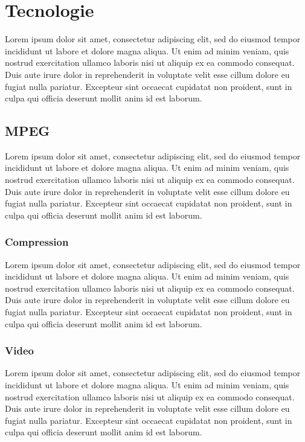 %
%
\chapter{Tecnologie}

Lorem ipsum dolor sit amet, consectetur adipiscing elit, sed do eiusmod tempor incididunt ut labore et dolore magna aliqua. Ut enim ad minim veniam, quis nostrud exercitation ullamco laboris nisi ut aliquip ex ea commodo consequat. Duis aute irure dolor in reprehenderit in voluptate velit esse cillum dolore eu fugiat nulla pariatur. Excepteur sint occaecat cupidatat non proident, sunt in culpa qui officia deserunt mollit anim id est laborum.

\section{MPEG}
Lorem ipsum dolor sit amet, consectetur adipiscing elit, sed do eiusmod tempor incididunt ut labore et dolore magna aliqua. Ut enim ad minim veniam, quis nostrud exercitation ullamco laboris nisi ut aliquip ex ea commodo consequat. Duis aute irure dolor in reprehenderit in voluptate velit esse cillum dolore eu fugiat nulla pariatur. Excepteur sint occaecat cupidatat non proident, sunt in culpa qui officia deserunt mollit anim id est laborum.

\subsection{Compression}
Lorem ipsum dolor sit amet, consectetur adipiscing elit, sed do eiusmod tempor incididunt ut labore et dolore magna aliqua. Ut enim ad minim veniam, quis nostrud exercitation ullamco laboris nisi ut aliquip ex ea commodo consequat. Duis aute irure dolor in reprehenderit in voluptate velit esse cillum dolore eu fugiat nulla pariatur. Excepteur sint occaecat cupidatat non proident, sunt in culpa qui officia deserunt mollit anim id est laborum.

\subsection{Video}
Lorem ipsum dolor sit amet, consectetur adipiscing elit, sed do eiusmod tempor incididunt ut labore et dolore magna aliqua. Ut enim ad minim veniam, quis nostrud exercitation ullamco laboris nisi ut aliquip ex ea commodo consequat. Duis aute irure dolor in reprehenderit in voluptate velit esse cillum dolore eu fugiat nulla pariatur. Excepteur sint occaecat cupidatat non proident, sunt in culpa qui officia deserunt mollit anim id est laborum.

